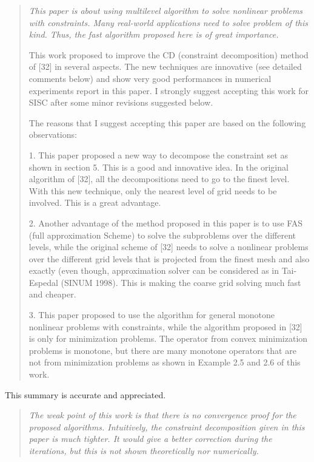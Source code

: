 \documentclass[letterpaper,final,12pt,reqno]{amsart}
\newenvironment{review}%
{\bigskip \par \begin{quote} \selectfont \sl}%
{\end{quote}}
\begin{document}
\begin{review}
This paper is about using multilevel algorithm to solve nonlinear problems with constraints. Many real-world applications need to solve problem of this kind. Thus, the fast algorithm proposed here is of great importance.

This work proposed to improve the CD (constraint decomposition) method of [32] in several aspects. The new techniques are innovative (see detailed comments below) and show very good performances in numerical experiments report in this paper. I strongly suggest accepting this work for SISC after some minor revisions suggested below.

The reasons that I suggest accepting this paper are based on the following observations:

1. This paper proposed a new way to decompose the constraint set as shown in section 5. This is a good and innovative idea. In the original algorithm of [32], all the decompositions need to go to the finest level. With this new technique, only the nearest level of grid needs to be involved. This is a great advantage.

2. Another advantage of the method proposed in this paper is to use FAS (full approximation Scheme) to solve the subproblems over the different levels, while the original scheme of [32] needs to solve a nonlinear problems over the different grid levels that is projected from the finest mesh and also exactly (even though, approximation solver can be considered as in Tai-Espedal (SINUM 1998). This is making the coarse grid solving much fast and cheaper.

3. This paper proposed to use the algorithm for general monotone nonlinear problems with constraints, while the algorithm proposed in [32] is only for minimization problems. The operator from convex minimization problems is monotone, but there are many monotone operators that are not from minimization problems as shown in Example 2.5 and 2.6 of this work.
\end{review}

\noindent This summary is accurate and appreciated.

\begin{review}
The weak point of this work is that there is no convergence proof for the proposed algorithms. Intuitively, the constraint decomposition given in this paper is much tighter. It would give a better correction during the iterations, but this is not shown theoretically nor numerically.
\end{review}
\end{document}
